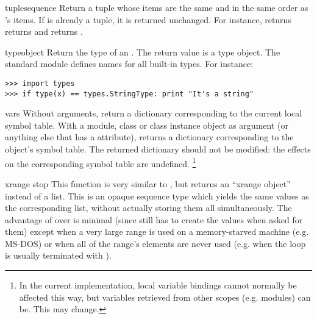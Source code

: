 \begin{funcdesc}{tuple}{sequence}
Return a tuple whose items are the same and in the same order as
's items.  If  is already a tuple, it
is returned unchanged.  For instance,  returns
returns  and  returns
.
\end{funcdesc}

\begin{funcdesc}{type}{object}
Return the type of an .  The return value is a type
object.  The standard module  defines names for all
built-in types.
For instance:

\bcode\begin{verbatim}
>>> import types
>>> if type(x) == types.StringType: print "It's a string"
\end{verbatim}\ecode
\end{funcdesc}

\begin{funcdesc}{vars}{}
Without arguments, return a dictionary corresponding to the current
local symbol table.  With a module, class or class instance object as
argument (or anything else that has a  attribute),
returns a dictionary corresponding to the object's symbol table.
The returned dictionary should not be modified: the effects on the
corresponding symbol table are undefined.%
\footnote{In the current implementation, local variable bindings
cannot normally be affected this way, but variables retrieved from
other scopes (e.g. modules) can be.  This may change.}
\end{funcdesc}

\begin{funcdesc}{xrange}{ stop}
This function is very similar to , but returns an
``xrange object'' instead of a list.  This is an opaque sequence type
which yields the same values as the corresponding list, without
actually storing them all simultaneously.  The advantage of
 over  is minimal (since 
still has to create the values when asked for them) except when a very
large range is used on a memory-starved machine (e.g. MS-DOS) or when all
of the range's elements are never used (e.g. when the loop is usually
terminated with ).
\end{funcdesc}
